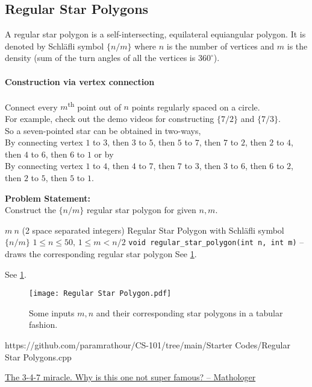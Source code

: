 \documentclass[../../Problems]{subfiles}
\begin{document}
\subsection{Regular Star Polygons}{\label{pp:regularstarpolygons}}
A regular star polygon is a self-intersecting, equilateral equiangular polygon. It is denoted by Schl\"afli symbol $\{n/m\}$ where $n$ is the number of vertices and $m$ is the density (sum of the turn angles of all the vertices is $360^\circ$).
\vspace{-1em}\paragraph{Construction via vertex connection} Connect every $m$\textsuperscript{th} point out of $n$ points regularly spaced on a circle.\\
For example, check out the demo videos for constructing \href{https://youtu.be/NX0khrwWB9A}{$\{7/2\}$} and \href{https://youtu.be/7obp1LBAmBQ}{$\{7/3\}$}.\\
So a seven-pointed star can be obtained in two-ways,\\
By connecting vertex $1$ to $3$, then $3$ to $5$, then $5$ to $7$, then $7$ to $2$, then $2$ to $4$, then $4$ to $6$, then $6$ to $1$ or by\\
By connecting vertex $1$ to $4$, then $4$ to $7$, then $7$ to $3$, then $3$ to $6$, then $6$ to $2$, then $2$ to $5$, then $5$ to $1$.

\textbf{Problem Statement:}\\
Construct the $\{n/m\}$ regular star polygon for given $n,m$.
\begin{testcasesFunction}
	{$m\ n$ \hfill(2 space separated integers)}
	{Regular Star Polygon with Schl\"afli symbol $\{n/m\}$}
	{$1 \leq n \leq 50$, $1 \leq m < n/2$}
	{\texttt{void regular\_star\_polygon(int n, int m)} -- draws the corresponding regular star polygon}
	{See \ref{fig:regularstarpolygons}.}
	{See \ref{fig:regularstarpolygons}.
	\begin{figure}[H]
	\texttt{[image: Regular Star Polygon.pdf]}
	\caption{Some inputs $m,n$ and their corresponding star polygons in a tabular fashion.}
	\label{fig:regularstarpolygons}
	\end{figure}
	}
	{https://github.com/paramrathour/CS-101/tree/main/Starter Codes/Regular Star Polygons.cpp}
\end{testcasesFunction}
\begin{funvideo}
\href{https://youtu.be/oEN0o9ZGmOM}{The 3-4-7 miracle. Why is this one not super famous? -- Mathologer}
\end{funvideo}
\end{document}
